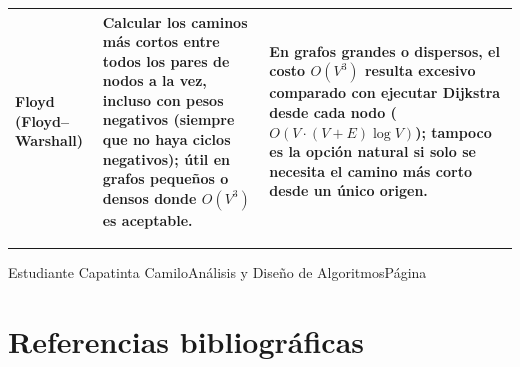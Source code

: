 \documentclass{article}
\newcommand{\itemCourse}{Análisis y Diseño de Algoritmos}
\newcommand{\landscapefooter}{%
    \vfill
    \noindent\hrule\vspace{0.15cm}
    \noindent Estudiante Capatinta Camilo\hfill\itemCourse\hfill Página \thepage
}
\begin{document}
\begin{landscape}
\begin{tabular}{@{}p{3.3cm} p{5.6cm} p{5.6cm}@{}}
            Floyd (Floyd–Warshall) \cite{floyd1962} & Calcular los caminos más cortos entre todos los pares de nodos a la vez, incluso con pesos negativos (siempre que no haya ciclos negativos); útil en grafos pequeños o densos donde $O(V^3)$ es aceptable. & En grafos grandes o dispersos, el costo $O(V^3)$ resulta excesivo comparado con ejecutar Dijkstra desde cada nodo ($O(V\cdot(V+E)\log V)$); tampoco es la opción natural si solo se necesita el camino más corto desde un único origen. \\
            \bottomrule
        \end{tabular}
        \par
    \endgroup
    \landscapefooter
    \end{landscape}
    \restoregeometry

    \section{Referencias bibliográficas}
    
    \nocite{*}
    

    
\end{document}
